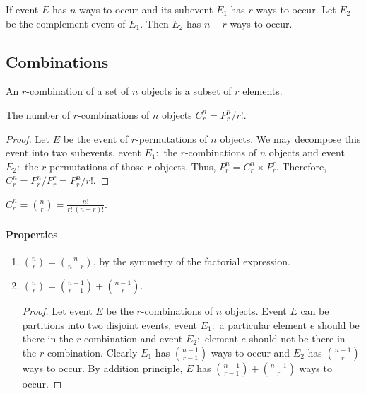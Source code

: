 \begin{definition}
	If event $E$ has $n$ ways to occur and its subevent $E_1$ has $r$ ways to occur. Let $E_2$ be the complement event of $E_1$. Then $E_2$ has $n-r$ ways to occur.
\end{definition}

\subsection{Combinations}
\begin{definition}
	An $r$-combination of a set of $n$ objects is a subset of $r$ elements.
\end{definition}
\begin{theorem}
	The number of $r$-combinations of $n$ objects $C^n_r = P^n_r/r!$.
\end{theorem}
\begin{proof}
	Let $E$ be the event of $r$-permutations of $n$ objects. We may decompose this event into two subevents, event $E_1 :$ the $r$-combinations of $n$ objects and event $E_2 :$ the $r$-permutations of those $r$ objects. Thus, $P^n_r = C^n_r \times P^r_r$.
	Therefore, $C^n_r = P^n_r/P^r_r = P^n_r / r!$.
\end{proof}

\begin{remark}
	$C^n_r = \binom{n}{r} = \frac{n!}{r!\ (n-r)!}$.
\end{remark}
\paragraph{Properties}
\begin{enumerate}
	\item $\binom{n}{r} = \binom{n}{n-r}$, by the symmetry of the factorial expression.
	\item $\binom{n}{r} = \binom{n-1}{r-1} + \binom{n-1}{r}$.
	\begin{proof}
		Let event $E$ be the $r$-combinations of $n$ objects. Event $E$ can be partitions into two disjoint events, event $E_1 :$ a particular element $e$ should be there in the $r$-combination and event $E_2 :$ element $e$ should not be there in the $r$-combination. Clearly $E_1$ has $\binom{n-1}{r-1}$ ways to occur and $E_2$ has $\binom{n-1}{r}$ ways to occur. By addition principle, $E$ has $\binom{n-1}{r-1} + \binom{n-1}{r}$ ways to occur.
	\end{proof}
\end{enumerate}
